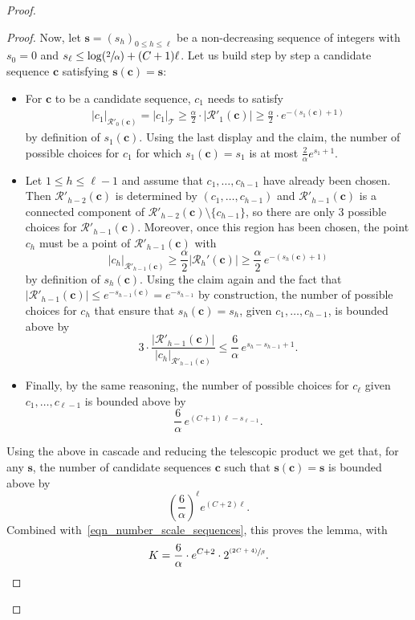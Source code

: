 \documentclass[JEP,XML,SOM,Unicode,NoFloatCountersInSection,published]{cedram}
\let\backslash\setminus
\newcommand{\Psfrac}[2]{(\sfrac{#1}{#2})}
\newcommand{\psfrac}[2]{\sfrac{(#1)}{#2}}
\newcommand{\Tt}{\mathcal{T}}
\newcommand{\Rr}{\mathcal{R}}
\theoremstyle{plain}
\theoremstyle{definition}
\begin{document}
\begin{proof}
\begin{proof}
Now, let $\mathbf{s}=(s_h)_{0 \leq h \leq \ell}$ be a non-decreasing sequence of integers with $s_0=0$ and $s_{\ell} \leq \log \Psfrac{2}{\alpha} +(C+1)\ell$.
Let us build step by step a candidate sequence $\mathbf{c}$ satisfying $\mathbf{s}(\mathbf{c})=\mathbf{s}$:
\begin{itemize}
\item For $\mathbf{c}$ to be a candidate sequence, $c_1$ needs to satisfy
\begin{align*}
|c_1|_{\Rr'_{0}(\mathbf{c})}=|c_1|_{\Tt} \geq \frac{\alpha}{2}\cdot |\Rr'_{1}(\mathbf{c})| \geq \frac{\alpha}{2}\cdot e^{-(s_1(\mathbf{c})+1)}
\end{align*}
by definition of $s_1(\mathbf{c})$.
Using the last display and the claim, the number of possible choices for $c_1$ for which $s_1(\mathbf{c})=s_1$ is at most $\frac{2}{\alpha} e^{s_1+1}$.
\item Let $1 \leq h \leq \ell-1$ and assume that $c_1, \dots, c_{h-1}$ have already been chosen.
Then $\Rr'_{h-2}(\mathbf{c})$ is determined by $(c_1, \dots, c_{h-1})$ and $\Rr'_{h-1}(\mathbf{c})$ is a connected component of $\Rr'_{h-2}(\mathbf{c}) \backslash \{ c_{h-1} \}$, so there are only $3$ possible choices for $\Rr'_{h-1}(\mathbf{c})$.
Moreover, once this region has been chosen, the point $c_h$ must be a point of $\Rr'_{h-1}(\mathbf{c})$ with
\[
|c_h|_{\Rr'_{h-1}(\mathbf{c})} \geq \frac{\alpha}{2} \left| \Rr_h'(\mathbf{c}) \right| \geq \frac{\alpha}{2}\, e^{-(s_h(\mathbf{c})+1)}
\]
by definition of $s_h(\mathbf{c})$.
Using the claim again and the fact that $|\Rr'_{h-1}(\mathbf{c})| \leq e^{-s_{h-1}(\mathbf{c})}=e^{-s_{h-1}}$ by construction,
the number of possible choices for $c_h$ that ensure that \hbox{$s_h(\mathbf{c})=s_h$}, given $c_1, \dots, c_{h-1}$, is bounded above by
\[
3 \cdot \frac{\left| \Rr'_{h-1}(\mathbf{c}) \right|}{|c_h|_{\Rr'_{h-1}(\mathbf{c})}} \leq \frac{6}{\alpha}\, e^{s_h-s_{h-1}+1}.
\]
\item Finally, by the same reasoning, the number of possible choices for $c_{\ell}$ given $c_1, \dots, c_{\ell-1}$ is bounded above by
\[ \frac{6}{\alpha}\, e^{(C+1)\ell-s_{\ell-1}}.\]
\end{itemize}
Using the above in cascade and reducing the telescopic product we get that, for any $\mathbf{s}$, the number of candidate sequences $\mathbf{c}$ such that $\mathbf{s}(\mathbf{c})=\mathbf{s}$ is bounded above by
\[
\left( \frac{6}{\alpha} \right)^{\ell} e^{(C+2)\ell}.
\]
Combined with~\eqref{eqn_number_scale_sequences}, this proves the lemma, with
\begin{equation}\label{eq:formula for K}
K=\frac{6}{\alpha} \cdot e^{C+2} \cdot 2^{\psfrac{2C+4}{\beta}}.\qedhere
\end{equation}
\end{proof}


\end{proof}
\end{document}
